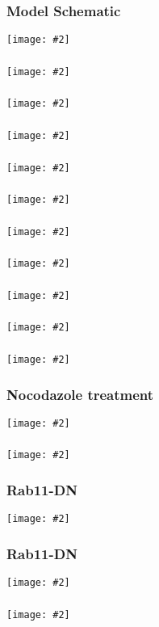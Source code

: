 \documentclass{beamer}
\newcommand{\plotslide}[2]{
  \begin{frame}
    \frametitle{#1}
    \centering
    \texttt{[image: \#2]}
  \end{frame}
}
\begin{document}
\plotslide{Model Schematic}{../tikz/flow.pdf}

\plotslide{}{StotVsMAPKpp.pdf}

\plotslide{}{SmemVsp3.pdf}

\plotslide{}{../hao/dose_response_ERK_t.png}
\plotslide{}{InputVsMAPKpp.pdf}

\plotslide{}{../hao/dose_response_MI_t.png}
\plotslide{}{InputVsMI.pdf}

\plotslide{}{../hao/exp-MIvsS_t.png}
\plotslide{}{ScaffoldVsMAPKppMI.pdf}

\plotslide{}{../hao/gradient_response_t.png}
\plotslide{}{GradientVsMI.pdf}

\plotslide{Nocodazole treatment}{../hao/noco_t.png}
\plotslide{}{noco.pdf}

\plotslide{Rab11-DN}{../hao/Rab11DN_t.png}
\plotslide{Rab11-DN}{rab11dn.pdf}


\plotslide{}{../hao/drugs_t.png}
\end{document}
